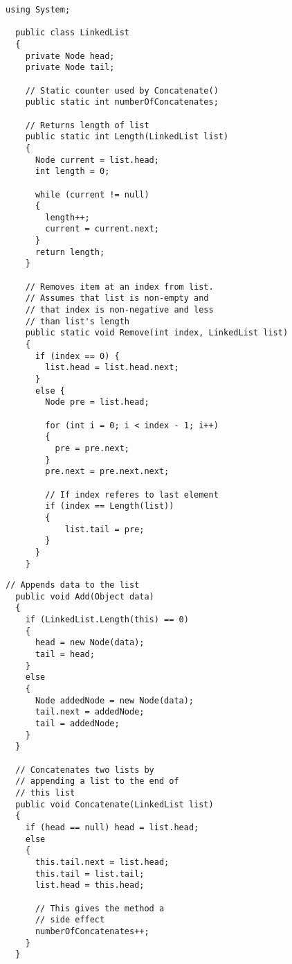 \documentclass[a4paper,12pt]{article}
\begin{document}
\begin{figure}[H]
  \centering
  \begin{minipage}[t]{0.52\linewidth}
    \begin{lstlisting}[basicstyle={\fontsize{8}{9}\ttfamily}]
  using System;

  public class LinkedList
  {
    private Node head;
    private Node tail;

    // Static counter used by Concatenate()
    public static int numberOfConcatenates;

    // Returns length of list
    public static int Length(LinkedList list)
    {
      Node current = list.head;
      int length = 0;

      while (current != null)
      {
        length++;
        current = current.next;
      }
      return length;
    }

    // Removes item at an index from list.
    // Assumes that list is non-empty and
    // that index is non-negative and less
    // than list's length
    public static void Remove(int index, LinkedList list)
    {
      if (index == 0) {
        list.head = list.head.next;
      }
      else {
        Node pre = list.head;

        for (int i = 0; i < index - 1; i++)
        {
          pre = pre.next;
        }
        pre.next = pre.next.next;

        // If index referes to last element
        if (index == Length(list))
        {
            list.tail = pre;
        }
      }
    }
    \end{lstlisting}
  \end{minipage}
  \begin{minipage}[t]{0.46\linewidth}
    \begin{lstlisting}[basicstyle={\fontsize{8}{9}\ttfamily}]
  // Appends data to the list
  public void Add(Object data)
  {
    if (LinkedList.Length(this) == 0)
    {
      head = new Node(data);
      tail = head;
    }
    else
    {
      Node addedNode = new Node(data);
      tail.next = addedNode;
      tail = addedNode;
    }
  }

  // Concatenates two lists by
  // appending a list to the end of
  // this list
  public void Concatenate(LinkedList list)
  {
    if (head == null) head = list.head;
    else
    {
      this.tail.next = list.head;
      this.tail = list.tail;
      list.head = this.head;

      // This gives the method a
      // side effect
      numberOfConcatenates++;
    }
  }


\end{lstlisting}
\end{minipage}
\end{figure}
\end{document}

